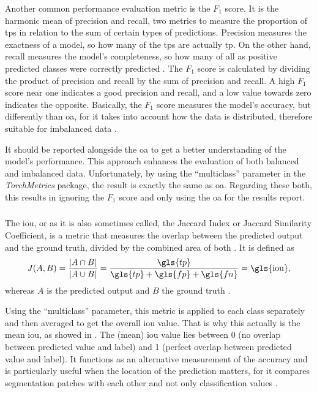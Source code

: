 Another common performance evaluation metric is the \( F_{1} \) score. It is the harmonic mean of precision and recall, two metrics to measure the proportion of \glspl{tp} in relation to the sum of certain types of predictions. Precision measures the exactness of a model, so how many of the \glspl{tp} are actually \gls{tp}. On the other hand, recall measures the model's completeness, so how many of all as positive predicted classes were correctly predicted \autocite{Hu.Li.ea2020,Mi.Chen2020,Mohammed.Kora2023,Zhao.Tu.ea2023}. The \( F_{1} \) score is calculated by dividing the product of precision and recall by the sum of precision and recall. A high \( F_{1} \) score near one indicates a good precision and recall, and a low value towards zero indicates the opposite. Basically, the \( F_{1} \) score measures the model's accuracy, but differently than \gls{oa}, for it takes into account how the data is distributed, therefore suitable for imbalanced data \autocite{Chicco.Jurman2020,Mi.Chen2020,Powers.Ailab2011,Zhao.Tu.ea2023}.

It should be reported alongside the \gls{oa} to get a better understanding of the model's performance. This approach enhances the evaluation of both balanced and imbalanced data. Unfortunately, by using the \enquote{multiclass} parameter in the \emph{TorchMetrics} package, the result is exactly the same as \gls{oa}. Regarding these both, this results in ignoring the \( F_{1} \) score and only using the \gls{oa} for the results report.

\subsubsection*{}

The \gls{iou}, or as it is also sometimes called, the Jaccard Index or Jaccard Similarity Coefficient, is a metric that measures the overlap between the predicted output and the ground truth, divided by the combined area of both \autocite{Csurka.Larlus2013,Demir.Musaoglu2023}. It is defined as
\begin{equation}
    J(A,B) = \frac{|A\cap B|}{|A\cup B|} = \frac{\gls{tp}}{\gls{tp} + \gls{fp} + \gls{fn}} = \text{\gls{iou}},
\end{equation}
whereas \( A \) is the predicted output and \( B \) the ground truth \autocite{Demir.Musaoglu2023,Torchmetrics2024b}.

Using the \enquote{multiclass} parameter, this metric is applied to each class separately and then averaged to get the overall \gls{iou} value. That is why this actually is the mean \gls{iou}, as showed in \textcite{Minaee.Boykov.ea2022,Zhao.Tu.ea2023}. The (mean) \gls{iou} value lies between 0 (no overlap between predicted value and label) and 1 (perfect overlap between predicted value and label). It functions as an alternative measurement of the accuracy and is particularly useful when the location of the prediction matters, for it compares segmentation patches with each other and not only classification values \autocite{Chicco.Jurman2020,Mi.Chen2020}.

